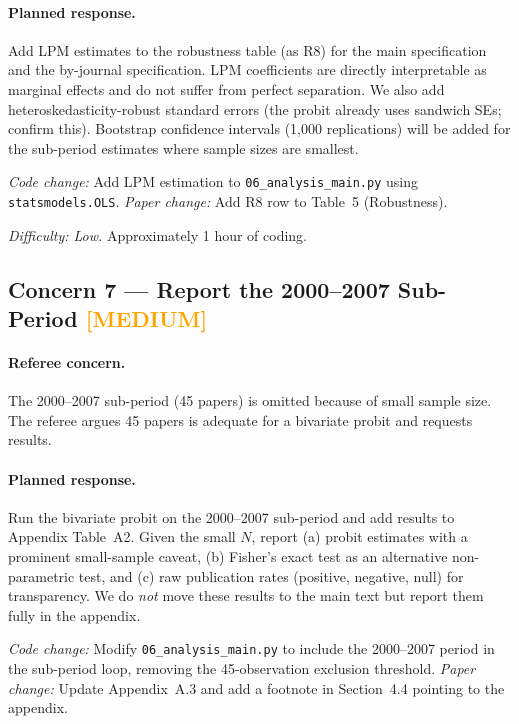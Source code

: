 \documentclass[12pt]{article}
\newcommand{\MED}{\textcolor{orange}{\textbf{[MEDIUM]}}}
\begin{document}
\paragraph{Planned response.}
Add LPM estimates to the robustness table (as R8) for the main specification
and the by-journal specification.  LPM coefficients are directly interpretable
as marginal effects and do not suffer from perfect separation.  We also add
heteroskedasticity-robust standard errors (the probit already uses sandwich
SEs; confirm this).  Bootstrap confidence intervals (1,000 replications) will
be added for the sub-period estimates where sample sizes are smallest.

\textit{Code change:} Add LPM estimation to \texttt{06\_analysis\_main.py}
using \texttt{statsmodels.OLS}.  \textit{Paper change:} Add R8 row to
Table~5 (Robustness).

\textit{Difficulty: Low.}  Approximately 1 hour of coding.

\subsection{Concern 7 --- Report the 2000--2007 Sub-Period \MED}

\paragraph{Referee concern.}
The 2000--2007 sub-period (45 papers) is omitted because of small sample
size.  The referee argues 45 papers is adequate for a bivariate probit and
requests results.

\paragraph{Planned response.}
Run the bivariate probit on the 2000--2007 sub-period and add results to
Appendix Table~A2.  Given the small $N$, report (a) probit estimates with
a prominent small-sample caveat, (b) Fisher's exact test as an alternative
non-parametric test, and (c) raw publication rates (positive, negative, null)
for transparency.  We do \emph{not} move these results to the main text but
report them fully in the appendix.

\textit{Code change:} Modify \texttt{06\_analysis\_main.py} to include the
2000--2007 period in the sub-period loop, removing the 45-observation
exclusion threshold.  \textit{Paper change:} Update Appendix~A.3
and add a footnote in Section~4.4 pointing to the appendix.
\end{document}
